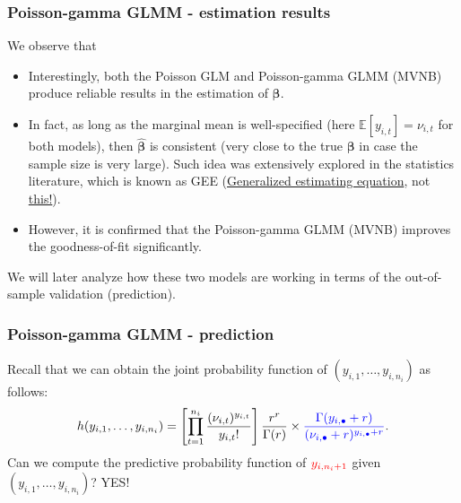 \documentclass[ignorenonframetext,]{beamer}
\begin{document}
\begin{frame}
\frametitle{Poisson-gamma GLMM - estimation results}

We observe that
\begin{itemize}
	\item Interestingly, both the Poisson GLM and Poisson-gamma GLMM (MVNB) produce reliable results in the estimation of $\bm{\beta}$.
	\item In fact, as long as the marginal mean is well-specified (here $\mathbb{E}[y_{i,t}] = \nu_{i,t}$ for both models), then $\hat{\bm{\beta}}$ is consistent (very close to the true $\bm{\beta}$ in case the sample size is very large). Such idea was extensively explored in the statistics literature, which is known as GEE (\href{https://en.wikipedia.org/wiki/Generalized_estimating_equation}{\color{cyan}Generalized estimating equation}, not \href{https://www.google.com/search?q=gee+snsd}{\color{cyan}this!}).
	\item However, it is confirmed that the Poisson-gamma GLMM (MVNB) improves the goodness-of-fit significantly.
\end{itemize}
We will later analyze how these two models are working in terms of the out-of-sample validation (prediction).

\end{frame}

\begin{frame}
\frametitle{Poisson-gamma GLMM - prediction}

Recall that we can obtain the joint probability function of $(y_{i,1}, \ldots, y_{i,n_i})$ as follows:
$$
h(y_{i,1}, \ldots, y_{i,n_i}) = \left[ \prod_{t=1}^{n_i} \frac{(\nu_{i,t})^{y_{i,t}}}{y_{i,t}!} \right] \frac{r^r}{\Gamma(r)} \times {\color{blue}\frac{\Gamma(y_{i,\bullet}+r)}{(\nu_{i,\bullet} + r)^{y_{i,\bullet}+r}}}.
$$
Can we compute the predictive probability function of ${\color{red}y_{i,n_i+1}}$ given $(y_{i,1}, \ldots, y_{i,n_i})$? \pause YES!

\end{frame}
\end{document}
